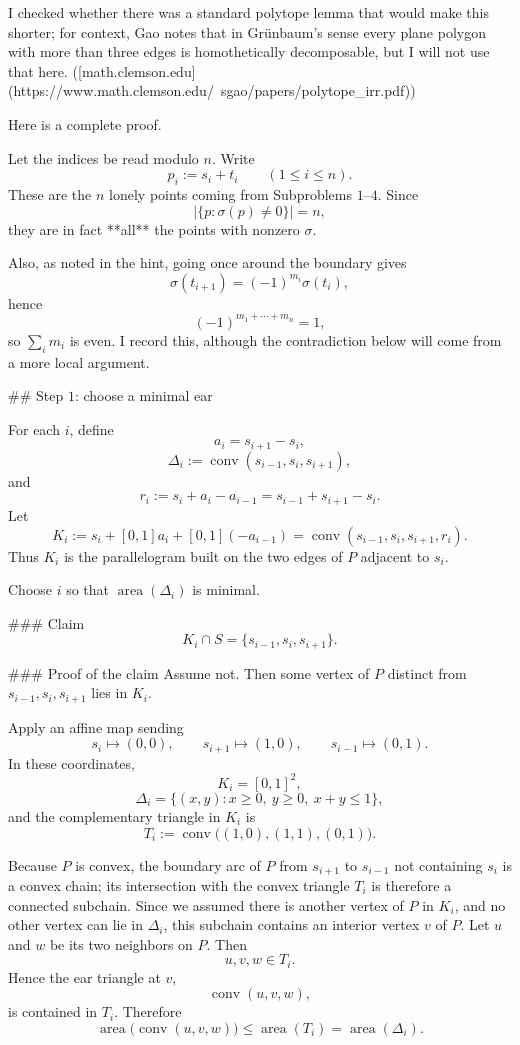 I checked whether there was a standard polytope lemma that would make this shorter; for context, Gao notes that in Grünbaum’s sense every plane polygon with more than three edges is homothetically decomposable, but I will not use that here. ([math.clemson.edu](https://www.math.clemson.edu/~sgao/papers/polytope_irr.pdf))

Here is a complete proof.

Let the indices be read modulo \(n\).  
Write
\[
p_i:=s_i+t_i \qquad (1\le i\le n).
\]
These are the \(n\) lonely points coming from Subproblems \(1\)–\(4\). Since
\[
\bigl|\{p:\sigma(p)\neq 0\}\bigr|=n,
\]
they are in fact **all** the points with nonzero \(\sigma\).

Also, as noted in the hint, going once around the boundary gives
\[
\sigma(t_{i+1})=(-1)^{m_i}\sigma(t_i),
\]
hence
\[
(-1)^{m_1+\cdots+m_n}=1,
\]
so \(\sum_i m_i\) is even. I record this, although the contradiction below will come from a more local argument.

## Step \(1\): choose a minimal ear

For each \(i\), define
\[
a_i=s_{i+1}-s_i,
\]
\[
\Delta_i:=\operatorname{conv}(s_{i-1},s_i,s_{i+1}),
\]
and
\[
r_i:=s_i+a_i-a_{i-1}=s_{i-1}+s_{i+1}-s_i.
\]
Let
\[
K_i:=s_i+[0,1]a_i+[0,1](-a_{i-1})
=\operatorname{conv}(s_{i-1},s_i,s_{i+1},r_i).
\]
Thus \(K_i\) is the parallelogram built on the two edges of \(P\) adjacent to \(s_i\).

Choose \(i\) so that \(\operatorname{area}(\Delta_i)\) is minimal.

### Claim
\[
K_i\cap S=\{s_{i-1},s_i,s_{i+1}\}.
\]

### Proof of the claim
Assume not. Then some vertex of \(P\) distinct from \(s_{i-1},s_i,s_{i+1}\) lies in \(K_i\).

Apply an affine map sending
\[
s_i\mapsto (0,0),\qquad s_{i+1}\mapsto (1,0),\qquad s_{i-1}\mapsto (0,1).
\]
In these coordinates,
\[
K_i=[0,1]^2,
\]
\[
\Delta_i=\{(x,y):x\ge 0,\ y\ge 0,\ x+y\le 1\},
\]
and the complementary triangle in \(K_i\) is
\[
T_i:=\operatorname{conv}\bigl((1,0),(1,1),(0,1)\bigr).
\]

Because \(P\) is convex, the boundary arc of \(P\) from \(s_{i+1}\) to \(s_{i-1}\) not containing \(s_i\) is a convex chain; its intersection with the convex triangle \(T_i\) is therefore a connected subchain. Since we assumed there is another vertex of \(P\) in \(K_i\), and no other vertex can lie in \(\Delta_i\), this subchain contains an interior vertex \(v\) of \(P\). Let \(u\) and \(w\) be its two neighbors on \(P\). Then
\[
u,v,w\in T_i.
\]
Hence the ear triangle at \(v\),
\[
\operatorname{conv}(u,v,w),
\]
is contained in \(T_i\). Therefore
\[
\operatorname{area}\bigl(\operatorname{conv}(u,v,w)\bigr)
\le \operatorname{area}(T_i)
= \operatorname{area}(\Delta_i).
\]

